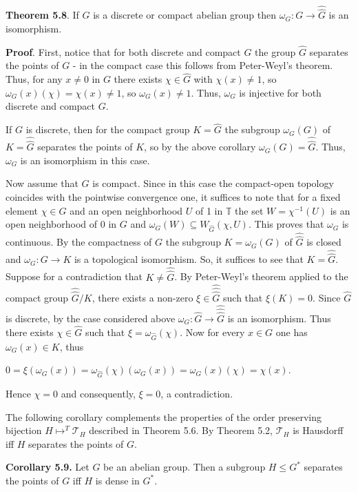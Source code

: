 \documentclass[12pt]{article}
\begin{document}
\textbf{Theorem 5.8}. If $G$ is a discrete or compact abelian group then $\omega_G : G \to \hat{\hat{G}}$ is an isomorphism.


\textbf{Proof}. First, notice that for both discrete and compact $G$ the group $\hat{G}$ separates the points of $G$ - in the compact case this
follows from Peter-Weyl's theorem. Thus, for any $x \neq 0$ in $G$ there exists $\chi \in \hat{G}$ with $\chi(x) \neq 1$, so $\omega_G(x)(\chi) = \chi(x) \neq 1$, so
$\omega_G(x) \neq 1$. Thus, $\omega_G$ is injective for both discrete and compact $G$.


    If $G$ is discrete, then for the compact group $K = \hat{G}$ the subgroup $\omega_G(G)$ of $K = \hat{\hat{G}}$ separates the points of $K$, so by the
above corollary $\omega_G(G) = \hat{\hat{G}}$. Thus, $\omega_G$ is an isomorphism in this case.


    Now assume that $G$ is compact. Since in this case the compact-open topology coincides with the pointwise convergence
one, it suffices to note that for a fixed element $\chi \in G$ and an open neighborhood $U$ of 1 in $\mathbb{T}$ the set $W = \chi^{-1} (U)$ is an
open neighborhood of 0 in $G$ and $\omega_G(W ) \subseteq W_{\hat{G}}(\chi, U)$. This proves that $\omega_G$ is continuous. By the compactness of $G$ the
subgroup $K = \omega_G(G)$ of $\hat{\hat{G}}$ is closed and $\omega_G : G \to K$ is a topological isomorphism. So, it suffices to see that $K = \hat{\hat{G}}$. Suppose
for a contradiction that $K \neq \hat{\hat{G}}$. By Peter-Weyl's theorem applied to the compact group $\hat{\hat{G}}/K$, there exists a non-zero $\xi \in \hat{\hat{\hat{G}}}$
such that $\xi(K) = 0$. Since $\hat{G}$ is discrete, by the case considered above $\omega_G : \hat{G} \to \hat{\hat{\hat{G}}}$ is an isomorphism. Thus there exists $\chi \in \hat{G}$
such that $\xi = \omega_{\hat{G}}(\chi)$. Now for every $x \in G$ one has $\omega_G(x) \in K$, thus


    $0 = \xi(\omega_G(x)) = \omega_{\hat{G}}(\chi)(\omega_G(x)) = \omega_G(x)(\chi) = \chi(x)$.


    Hence $\chi = 0$ and consequently, $\xi = 0$, a contradiction. 


    The following corollary complements the properties of the order preserving bijection $H \mapsto^T \mathcal{T}_H$ described in Theorem 5.6.
By Theorem 5.2, $\mathcal{T}_H$ is Hausdorff iff $H$ separates the points of $G$.


    \textbf{Corollary 5.9.} Let $G$ be an abelian group. Then a subgroup $H \leqslant G^*$ separates the points of $G$ iff $H$ is dense in $G^*$.
\end{document}
